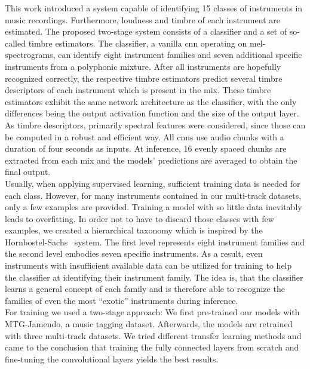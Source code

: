 This work introduced a system capable of identifying 15 classes of instruments in music recordings. Furthermore, loudness and timbre of each instrument are estimated. The proposed two-stage system consists of a classifier and a set of so-called timbre estimators. The classifier, a vanilla \gls{cnn} operating on mel-spectrograms, can identify eight instrument families and seven additional specific instruments from a polyphonic mixture. After all instruments are hopefully recognized correctly, the respective timbre estimators predict several timbre descriptors of each instrument which is present in the mix. These timbre estimators exhibit the same network architecture as the classifier, with the only differences being the output activation function and the size of the output layer. As timbre descriptors, primarily spectral features were considered, since those can be computed in a robust and efficient way. All \glspl{cnn} use audio chunks with a duration of four seconds as inputs. At inference, 16 evenly spaced chunks are extracted from each mix and the models' predictions are averaged to obtain the final output.\\

Usually, when applying supervised learning, sufficient training data is needed for each class. However, for many instruments contained in our multi-track datasets, only a few examples are provided. Training a model with so little data inevitably leads to overfitting. In order not to have to discard those classes with few examples, we created a hierarchical taxonomy which is inspired by the Hornbostel-Sachs~\cite{hornbostel1914systematik} system. The first level represents eight instrument families and the second level embodies seven specific instruments. As a result, even instruments with insufficient available data can be utilized for training to help the classifier at identifying their instrument family. The idea is, that the classifier learns a general concept of each family and is therefore able to recognize the families of even the most \enquote{exotic} instruments during inference.\\

For training we used a two-stage approach: We first pre-trained our models with MTG-Jamendo, a music tagging dataset. Afterwards, the models are retrained with three multi-track datasets. We tried different transfer learning methods and came to the conclusion that training the fully connected layers from scratch and fine-tuning the convolutional layers yields the best results.\\


